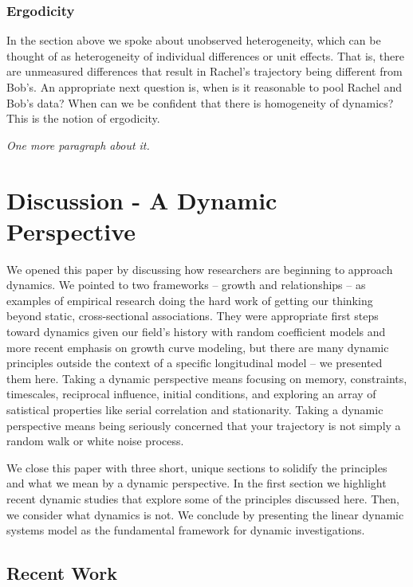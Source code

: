 \documentclass[english,,man]{apa6}
\theoremstyle{definition}
\theoremstyle{definition}
\theoremstyle{definition}
\theoremstyle{remark}
\begin{document}
\hypertarget{ergodicity}{%
\subsubsection{Ergodicity}\label{ergodicity}}

In the section above we spoke about unobserved heterogeneity, which can
be thought of as heterogeneity of individual differences or unit
effects. That is, there are unmeasured differences that result in
Rachel's trajectory being different from Bob's. An appropriate next
question is, when is it reasonable to pool Rachel and Bob's data? When
can we be confident that there is homogeneity of dynamics? This is the
notion of ergodicity.

\emph{One more paragraph about it.}

\hypertarget{discussion---a-dynamic-perspective}{%
\section{Discussion - A Dynamic
Perspective}\label{discussion---a-dynamic-perspective}}

We opened this paper by discussing how researchers are beginning to
approach dynamics. We pointed to two frameworks -- growth and
relationships -- as examples of empirical research doing the hard work
of getting our thinking beyond static, cross-sectional associations.
They were appropriate first steps toward dynamics given our field's
history with random coefficient models and more recent emphasis on
growth curve modeling, but there are many dynamic principles outside the
context of a specific longitudinal model -- we presented them here.
Taking a dynamic perspective means focusing on memory, constraints,
timescales, reciprocal influence, initial conditions, and exploring an
array of satistical properties like serial correlation and stationarity.
Taking a dynamic perspective means being seriously concerned that your
trajectory is not simply a random walk or white noise process.

We close this paper with three short, unique sections to solidify the
principles and what we mean by a dynamic perspective. In the first
section we highlight recent dynamic studies that explore some of the
principles discussed here. Then, we consider what dynamics is not. We
conclude by presenting the linear dynamic systems model as the
fundamental framework for dynamic investigations.

\hypertarget{recent-work}{%
\subsection{Recent Work}\label{recent-work}}
\end{document}
